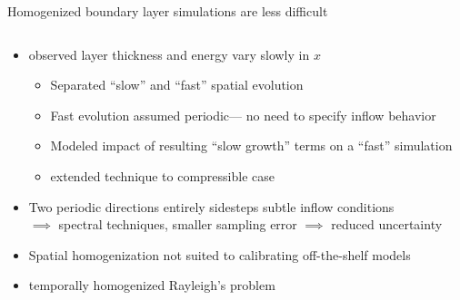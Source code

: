 \documentclass[mathserif]{beamer}
\begin{document}
\begin{frame}{Homogenized boundary layer simulations are less difficult}
\begin{columns}[c,onlytextwidth]
\begin{column}{0.20\linewidth}
    \centering
  \end{column}
\end{columns}
\begin{itemize}
  \item<1-> \citet{Spalart1988Direct} observed layer thickness and energy
        vary slowly in $x$
        \begin{itemize}
          \item Separated ``slow'' and ``fast'' spatial evolution
          \item Fast evolution assumed periodic---
                no need to specify inflow behavior
          \item Modeled impact of resulting ``slow growth'' terms on a
                ``fast'' simulation
          \item \citet{Guarini1998} extended technique to
                compressible case
        \end{itemize}
  \item<1-> Two periodic directions entirely sidesteps subtle inflow conditions\\
        $\implies$ spectral techniques, smaller sampling error
        $\implies$ reduced uncertainty
  \item<1-> Spatial homogenization not suited to calibrating off-the-shelf models
  \item<2-> \citet{Topalian2011Slow} temporally homogenized Rayleigh's problem

\end{itemize}
\end{frame}
\end{document}
